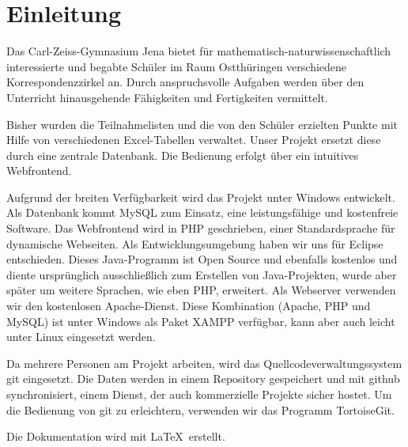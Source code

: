 \chapter{Einleitung}
Das Carl-Zeiss-Gymnasium Jena bietet für mathematisch-naturwissenschaftlich interessierte und begabte Schüler im Raum Ostthüringen verschiedene Korrespondenzzirkel an. Durch anspruchsvolle Aufgaben werden über den Unterricht hinausgehende Fähigkeiten und Fertigkeiten vermittelt. \cite{Korrespondenzzirkel}

Bisher wurden die Teilnahmelisten und die von den Schüler erzielten Punkte mit Hilfe von verschiedenen Excel-Tabellen verwaltet. Unser Projekt ersetzt diese durch eine zentrale Datenbank. Die Bedienung erfolgt über ein intuitives Webfrontend. 

Aufgrund der breiten Verfügbarkeit wird das Projekt unter Windows entwickelt. Als Datenbank kommt MySQL zum Einsatz, eine leistungsfähige und kostenfreie Software. Das Webfrontend wird in PHP geschrieben, einer Standardsprache für dynamische Webseiten. Als Entwicklungsumgebung haben wir uns für Eclipse entschieden. Dieses Java-Programm ist Open Source und ebenfalls kostenlos und diente ursprünglich ausschließlich zum Erstellen von Java-Projekten, wurde aber später um weitere Sprachen, wie eben PHP, erweitert. Als Webserver verwenden wir den kostenlosen Apache-Dienst. Diese Kombination (Apache, PHP und MySQL) ist unter Windows als Paket XAMPP verfügbar, kann aber auch leicht unter Linux eingesetzt werden. \cite{Apache} \cite{Eclipse} \cite{MySql} 

Da mehrere Personen am Projekt arbeiten, wird das Quellcodeverwaltungssystem git eingesetzt. Die Daten werden in einem Repository gespeichert und mit github synchronisiert, einem Dienst, der auch kommerzielle Projekte sicher hostet. Um die Bedienung von git zu erleichtern, verwenden wir das Programm TortoiseGit. \cite{git} \cite{Tortoisegit} \cite{github}

Die Dokumentation wird mit \LaTeX \ erstellt.

